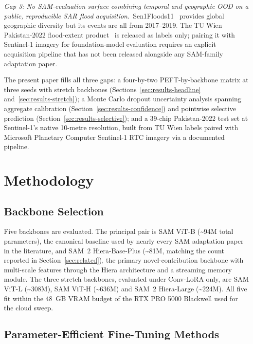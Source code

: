 \documentclass[conference]{IEEEtran}
\begin{document}
\textit{Gap 3: No SAM-evaluation surface combining temporal and geographic OOD on a public, reproducible SAR flood acquisition.}~Sen1Floods11~\cite{Bonafilia2020Sen1Floods11} provides global geographic diversity but its events are all from 2017--2019. The TU Wien Pakistan-2022 flood-extent product~\cite{Roth2023Pakistan} is released as labels only; pairing it with Sentinel-1 imagery for foundation-model evaluation requires an explicit acquisition pipeline that has not been released alongside any SAM-family adaptation paper.

The present paper fills all three gaps: a four-by-two PEFT-by-backbone matrix at three seeds with stretch backbones (Sections~\ref{sec:results-headline} and~\ref{sec:results-stretch}); a Monte Carlo dropout uncertainty analysis spanning aggregate calibration (Section~\ref{sec:results-confidence}) and pointwise selective prediction (Section~\ref{sec:results-selective}); and a 39-chip Pakistan-2022 test set at Sentinel-1's native 10-metre resolution, built from TU Wien labels paired with Microsoft Planetary Computer Sentinel-1 RTC imagery via a documented pipeline.

\section{Methodology}
\label{sec:methodology}

\subsection{Backbone Selection}

Five backbones are evaluated. The principal pair is SAM ViT-B (\textasciitilde 94M total parameters), the canonical baseline used by nearly every SAM adaptation paper in the literature, and SAM~2 Hiera-Base-Plus (\textasciitilde 81M, matching the count reported in Section~\ref{sec:related}), the primary novel-contribution backbone with multi-scale features through the Hiera architecture and a streaming memory module. The three stretch backbones, evaluated under Conv-LoRA only, are SAM ViT-L (\textasciitilde 308M), SAM ViT-H (\textasciitilde 636M) and SAM~2 Hiera-Large (\textasciitilde 224M). All five fit within the 48~GB VRAM budget of the RTX PRO 5000 Blackwell used for the cloud sweep.

\subsection{Parameter-Efficient Fine-Tuning Methods}
\end{document}
